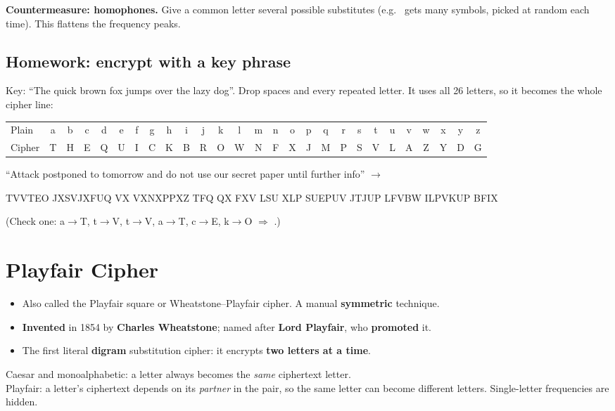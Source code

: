 \textbf{Countermeasure: homophones.} Give a common letter several possible substitutes (e.g.\  gets many symbols, picked at random each time). This flattens the frequency peaks.

\subsection{Homework: encrypt with a key phrase}
Key: ``The quick brown fox jumps over the lazy dog''. Drop spaces and every repeated letter. It uses all 26 letters, so it becomes the whole cipher line:
\begin{center}\small\setlength{\tabcolsep}{2.4pt}
\begin{tabular}{@{}l*{26}{c}@{}}
\toprule
Plain & a&b&c&d&e&f&g&h&i&j&k&l&m&n&o&p&q&r&s&t&u&v&w&x&y&z\\
Cipher & T&H&E&Q&U&I&C&K&B&R&O&W&N&F&X&J&M&P&S&V&L&A&Z&Y&D&G\\
\bottomrule
\end{tabular}
\end{center}
``Attack postponed to tomorrow and do not use our secret paper until further info'' $\to$
\begin{center}\small\ttfamily
TVVTEO JXSVJXFUQ VX VXNXPPXZ TFQ QX FXV LSU XLP SUEPUV JTJUP LFVBW ILPVKUP BFIX
\end{center}
(Check one: a$\to$T, t$\to$V, t$\to$V, a$\to$T, c$\to$E, k$\to$O $\Rightarrow$ .)

\section{Playfair Cipher}\label{sec:playfair}

\begin{itemize}
  \item Also called the Playfair square or Wheatstone--Playfair cipher. A manual \textbf{symmetric} technique.
  \item \textbf{Invented} in 1854 by \textbf{Charles Wheatstone}; named after \textbf{Lord Playfair}, who \textbf{promoted} it.
  \item The first literal \textbf{digram} substitution cipher: it encrypts \textbf{two letters at a time}.
\end{itemize}

\begin{keybox}[title=Single-letter vs.\ multiple-letter]
Caesar and monoalphabetic: a letter always becomes the \emph{same} ciphertext letter.\\
Playfair: a letter's ciphertext depends on its \emph{partner} in the pair, so the same letter can become different letters. Single-letter frequencies are hidden.
\end{keybox}

